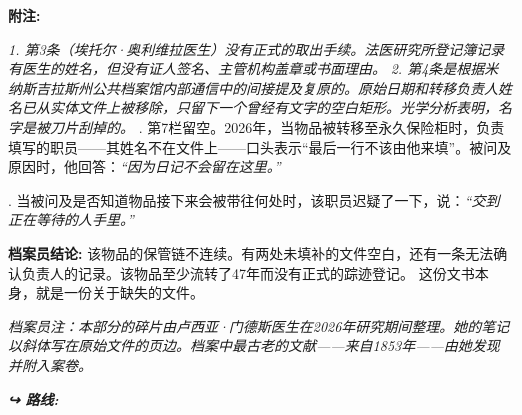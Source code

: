 \noindent \textbf{附注:}

\noindent \textit{1. 第3条（埃托尔·奥利维拉医生）没有正式的取出手续。法医研究所登记簿记录有医生的姓名，但没有证人签名、主管机构盖章或书面理由。}
\noindent \textit{2. 第4条是根据米纳斯吉拉斯州公共档案馆内部通信中的间接提及复原的。原始日期和转移负责人姓名已从实体文件上被移除，只留下一个曾经有文字的空白矩形。光学分析表明，名字是被刀片刮掉的。}
. 第7栏留空。2026年，当物品被转移至永久保险柜时，负责填写的职员——其姓名不在文件上——口头表示“最后一行不该由他来填”。被问及原因时，他回答：\textit{“因为日记不会留在这里。”}

. 当被问及是否知道物品接下来会被带往何处时，该职员迟疑了一下，说：\textit{“交到正在等待的人手里。”}

\noindent \textbf{档案员结论:}
\noindent 该物品的保管链不连续。有两处未填补的文件空白，还有一条无法确认负责人的记录。该物品至少流转了47年而没有正式的踪迹登记。
\noindent 这份文书本身，就是一份关于缺失的文件。





\noindent \textit{档案员注：本部分的碎片由卢西亚·门德斯医生在2026年研究期间整理。她的笔记以斜体写在原始文件的页边。档案中最古老的文献——来自1853年——由她发现并附入案卷。}



\vspace{0.5em}
\noindent\textit{\textbf{↪ 路线:}  \rotasep {}}
